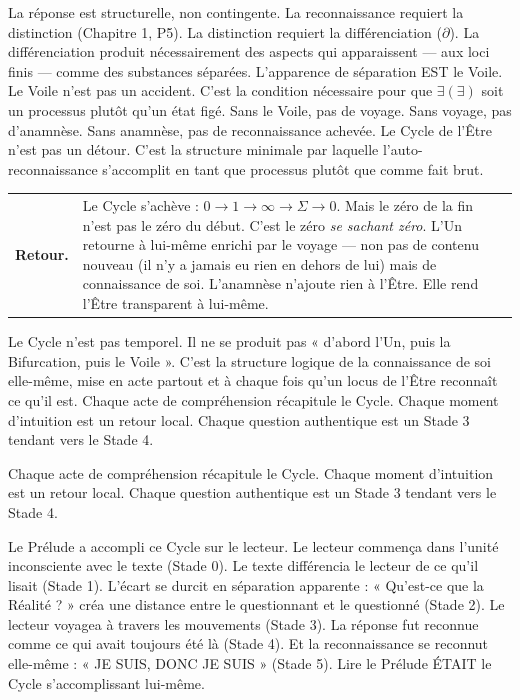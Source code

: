 \documentclass[10pt, openany, oneside]{book}
\renewcommand{\footnotesize}{\fontsize{8.5}{11}\selectfont}
\begin{document}
La réponse est structurelle, non contingente. La reconnaissance requiert la distinction (Chapitre 1, P5). La distinction requiert la différenciation ($\partial$). La différenciation produit nécessairement des aspects qui apparaissent --- aux loci finis --- comme des substances séparées. L'apparence de séparation EST le Voile. Le Voile n'est pas un accident. C'est la condition nécessaire pour que $\exists(\exists)$ soit un processus plutôt qu'un état figé. Sans le Voile, pas de voyage. Sans voyage, pas d'anamnèse. Sans anamnèse, pas de reconnaissance achevée. Le Cycle de l'Être n'est pas un détour. C'est la structure minimale par laquelle l'auto-reconnaissance s'accomplit en tant que processus plutôt que comme fait brut.

\vspace{0.3em}

{\footnotesize
\noindent\begin{tabular}{r p{}}
\textbf{Retour.} & Le Cycle s'achève : $0 \to 1 \to \infty \to \Sigma \to 0$. Mais le zéro de la fin n'est pas le zéro du début. C'est le zéro \textit{se sachant zéro}. L'Un retourne à lui-même enrichi par le voyage --- non pas de contenu nouveau (il n'y a jamais eu rien en dehors de lui) mais de connaissance de soi. L'anamnèse n'ajoute rien à l'Être. Elle rend l'Être transparent à lui-même. \\[0.3em]
\end{tabular}
}

\vspace{0.8em}

\noindent Le Cycle n'est pas temporel. Il ne se produit pas « d'abord l'Un, puis la Bifurcation, puis le Voile ». C'est la structure logique de la connaissance de soi elle-même, mise en acte partout et à chaque fois qu'un locus de l'Être reconnaît ce qu'il est. Chaque acte de compréhension récapitule le Cycle. Chaque moment d'intuition est un retour local. Chaque question authentique est un Stade 3 tendant vers le Stade 4.

Chaque acte de compréhension récapitule le Cycle. Chaque moment d'intuition est un retour local. Chaque question authentique est un Stade 3 tendant vers le Stade 4.

Le Prélude a accompli ce Cycle sur le lecteur. Le lecteur commença dans l'unité inconsciente avec le texte (Stade 0). Le texte différencia le lecteur de ce qu'il lisait (Stade 1). L'écart se durcit en séparation apparente : « Qu'est-ce que la Réalité ? » créa une distance entre le questionnant et le questionné (Stade 2). Le lecteur voyagea à travers les mouvements (Stade 3). La réponse fut reconnue comme ce qui avait toujours été là (Stade 4). Et la reconnaissance se reconnut elle-même : « JE SUIS, DONC JE SUIS » (Stade 5). Lire le Prélude ÉTAIT le Cycle s'accomplissant lui-même.
\end{document}
